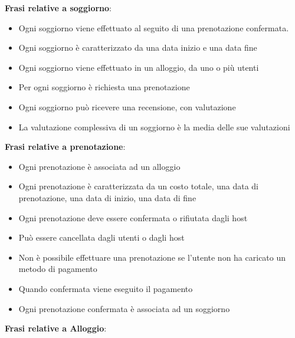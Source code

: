 \bigskip
\textbf{Frasi relative a soggiorno}:
\begin{itemize}
    \item Ogni soggiorno viene effettuato al seguito di una prenotazione confermata.
    \item Ogni soggiorno è caratterizzato da una data inizio e una data fine
    \item Ogni soggiorno viene effettuato in un alloggio, da uno o più utenti
    \item Per ogni soggiorno è richiesta una prenotazione
    \item Ogni soggiorno può ricevere una recensione, con valutazione
    \item La valutazione complessiva di un soggiorno è la media delle sue valutazioni
\end{itemize}
\bigskip
\textbf{Frasi relative a prenotazione}:
\begin{itemize}
    \item Ogni prenotazione è associata ad un alloggio
    \item Ogni prenotazione è caratterizzata da un costo totale, una data di prenotazione, una data di inizio, una data di fine
    \item Ogni prenotazione deve essere confermata o rifiutata dagli host
    \item Può essere cancellata dagli utenti o dagli host
    \item Non è possibile effettuare una prenotazione se l'utente non ha caricato un metodo di pagamento
    \item Quando confermata viene eseguito il pagamento
    \item Ogni prenotazione confermata è associata ad un soggiorno \\
\end{itemize}
\bigskip
\textbf{Frasi relative a Alloggio}:
